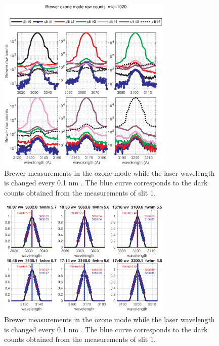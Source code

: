 \documentclass[acp]{copernicus} %
\begin{document}
\clearpage
%
\begin{figure}[t]
\includegraphics[width=8.3cm]{figures/General_laser_log.eps}
\caption{Brewer measurements in the ozone mode while the laser wavelength is changed every 0.1 nm . The blue curve corresponds to the dark counts obtained from the measurements of slit 1.}
\label{fig:laser_log}
\end{figure}

%
\clearpage
\begin{figure}[t]
\includegraphics[width=8.3cm]{figures/General_Laser_scan_dsp.eps}
\caption{Brewer measurements in the ozone mode while the laser wavelength is changed every 0.1 nm . The blue curve corresponds to the dark counts obtained from the measurements of slit 1.}
\label{fig:laser_dsp}
\end{figure}
\end{document}

